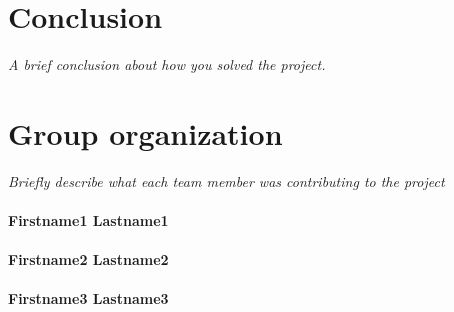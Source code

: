 \documentclass[11pt,oneside,a4paper]{article}
\newcommand{\hint}[1]{{\color{blue} \em #1}}
\begin{document}
\section{Conclusion}
\hint{A brief conclusion about how you solved the project.} \\
\lipsum[1]

\label{lastpage} %
\clearpage
{}



\clearpage
\appendix
{}

\section{Group organization}
\hint{Briefly describe what each team member was contributing to the project}

\paragraph{Firstname1 Lastname1}
\lipsum[2]

\paragraph{Firstname2 Lastname2}
\lipsum[3]

\paragraph{Firstname3 Lastname3}
\lipsum[4]
\end{document}
